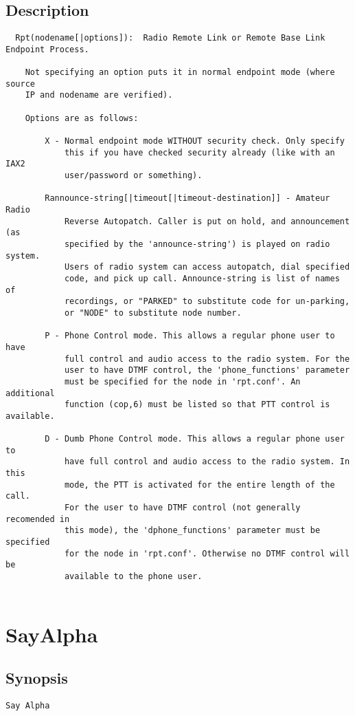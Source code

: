 \subsection{Description}
\begin{verbatim}
  Rpt(nodename[|options]):  Radio Remote Link or Remote Base Link Endpoint Process.

    Not specifying an option puts it in normal endpoint mode (where source
    IP and nodename are verified).

    Options are as follows:

        X - Normal endpoint mode WITHOUT security check. Only specify
            this if you have checked security already (like with an IAX2
            user/password or something).

        Rannounce-string[|timeout[|timeout-destination]] - Amateur Radio
            Reverse Autopatch. Caller is put on hold, and announcement (as
            specified by the 'announce-string') is played on radio system.
            Users of radio system can access autopatch, dial specified
            code, and pick up call. Announce-string is list of names of
            recordings, or "PARKED" to substitute code for un-parking,
            or "NODE" to substitute node number.

        P - Phone Control mode. This allows a regular phone user to have
            full control and audio access to the radio system. For the
            user to have DTMF control, the 'phone_functions' parameter
            must be specified for the node in 'rpt.conf'. An additional
            function (cop,6) must be listed so that PTT control is available.

        D - Dumb Phone Control mode. This allows a regular phone user to
            have full control and audio access to the radio system. In this
            mode, the PTT is activated for the entire length of the call.
            For the user to have DTMF control (not generally recomended in
            this mode), the 'dphone_functions' parameter must be specified
            for the node in 'rpt.conf'. Otherwise no DTMF control will be
            available to the phone user.


\end{verbatim}


\section{SayAlpha}
\subsection{Synopsis}
\begin{verbatim}
Say Alpha
\end{verbatim}
